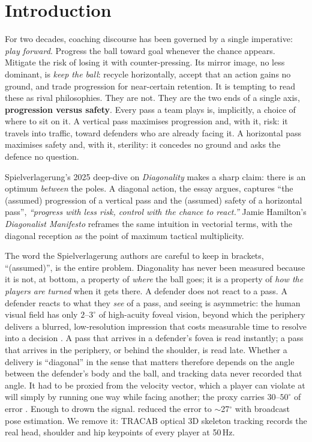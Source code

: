 \documentclass[11pt]{article}
\begin{document}
\section{Introduction}
\label{sec:intro}

For two decades, coaching discourse has been governed by a single
imperative: \emph{play forward}. Progress the ball toward goal whenever
the chance appears. Mitigate the risk of losing it with
counter-pressing. Its mirror image, no less dominant, is \emph{keep the
ball}: recycle horizontally, accept that an action gains no ground, and
trade progression for near-certain retention. It is tempting to read these
as rival philosophies. They are not. They are the two ends of a single
axis, \textbf{progression versus safety}. Every pass a team
plays is, implicitly, a choice of where to sit on it. A vertical pass
maximises progression and, with it, risk: it travels into traffic, toward
defenders who are already facing it. A horizontal pass maximises safety
and, with it, sterility: it concedes no ground and asks the defence no
question.

Spielverlagerung's 2025 deep-dive on \emph{Diagonality}
\citep{spielverlagerung2025} makes a sharp claim: there is an optimum
\emph{between} the poles. A diagonal action, the essay argues, captures
``the (assumed) progression of a vertical pass and the (assumed) safety of
a horizontal pass'', \emph{``progress with less risk, control with the
chance to react.''} Jamie Hamilton's \emph{Diagonalist Manifesto}
\citep{hamilton2024} reframes the same intuition in vectorial terms, with
the diagonal reception as the point of maximum tactical multiplicity.

The word the Spielverlagerung authors are careful to keep in brackets,
``(assumed)'', is the entire problem. Diagonality has never been
measured because it is not, at bottom, a property of \emph{where} the ball
goes; it is a property of \emph{how the players are turned} when it gets
there. A defender does not react to a pass. A defender reacts to what they
\emph{see} of a pass, and seeing is asymmetric: the human visual field has
only $2$--$3^\circ$ of high-acuity foveal vision, beyond which the
periphery delivers a blurred, low-resolution impression that costs
measurable time to resolve into a decision \citep{vater2024}. A pass that
arrives in a defender's fovea is read instantly; a pass that arrives in
the periphery, or behind the shoulder, is read late. Whether a delivery is
``diagonal'' in the sense that matters therefore depends on the angle
between the defender's body and the ball, and tracking data never
recorded that angle. It had to be proxied from the velocity vector, which
a player can violate at will simply by running one way while facing
another; the proxy carries $30$--$50^\circ$ of error \citep{arbues2020}.
Enough to drown the signal. \citet{bekkers2026} reduced the error to
$\sim$27$^\circ$ with broadcast pose estimation. We remove it: TRACAB
optical 3D skeleton tracking records the real head, shoulder and hip
keypoints of every player at 50\,Hz.
\end{document}
